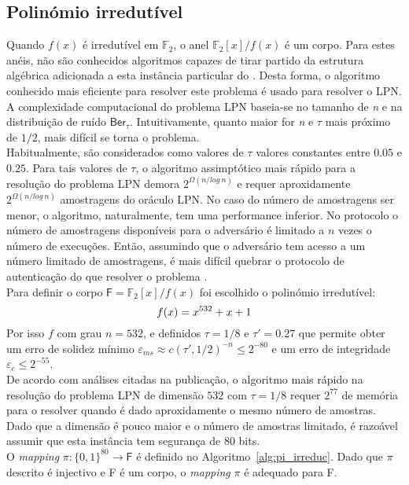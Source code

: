 \subsection{Polinómio irredutível}
Quando $f(x)$ é irredutível em $\mathbb{F}_2$, o anel $\mathbb{F}_2[x]/f(x)$ é um corpo. Para estes anéis, não são conhecidos algoritmos capazes de tirar partido da estrutura algébrica adicionada a esta instância particular do \RingLPN. Desta forma, o algoritmo conhecido mais eficiente para resolver este problema é usado para resolver o \textsf{LPN}.\\
A complexidade computacional do problema \textsf{LPN} baseia-se no tamanho de \textit{n} e na distribuição de ruído $\mathsf{Ber_\tau}$. Intuitivamente, quanto maior for \textit{n} e $\tau$ mais próximo de $1/2$, mais difícil se torna o problema.\\
Habitualmente, são considerados como valores de $\tau$ valores constantes entre $0.05$ e $0.25$. Para tais valores de $\tau$, o algoritmo assimptótico mais rápido para a resolução do problema \textsf{LPN} demora $2^{\Omega(n/log\ n)}$ e requer aproxidamente $2^{\Omega(n/log\ n)}$ amostragens do oráculo \textsf{LPN}. No caso do número de amostragens ser menor, o algoritmo, naturalmente, tem uma performance inferior. No protocolo o número de amostragens disponíveis para o adversário é limitado a $n$ vezes o número de execuções. Então, assumindo que o adversário tem acesso a um número limitado de amostragens, é mais difícil quebrar o protocolo de autenticação do que resolver o problema \RingLPN.\\
Para definir o corpo $\mathsf{F} = \mathbb{F}_2[x]/f(x)$ foi escolhido o polinómio irredutível:
$$
  f(x) = x^{532} + x + 1 \\
$$
Por isso $f$ com grau $n = 532$, e definidos $\tau = 1/8$ e $\tau' = 0.27$ que permite obter um erro de solidez mínimo $\varepsilon_{ms} \approx c(\tau', 1/2)^{-n} \le 2^{-80}$ e um erro de integridade $\varepsilon_{c} \le 2^{-55}$.\\ 
De acordo com análises citadas na publicação, o algoritmo mais rápido na resolução do problema \textsf{LPN} de dimensão $532$ com $\tau = 1/8$ requer $2^{77}$ de memória para o resolver quando é dado aproxidamente o mesmo número de amostras. Dado que a dimensão é pouco maior e o número de amostras limitado, é razoável assumir que esta instância tem segurança de $80$ bits.\\
O \textit{mapping} $\pi : \{0,1\}^{80} \rightarrow \mathsf{F}$ é definido no Algoritmo~\ref{alg:pi_irreduc}. Dado que $\pi$ descrito é injectivo e \textsf{F} é um corpo, o \textit{mapping} $\pi$ é adequado para \textsf{F}.
